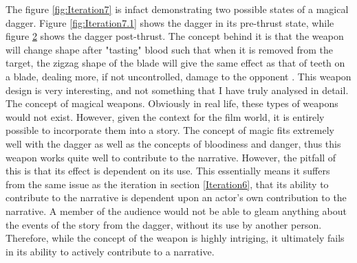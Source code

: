 \documentclass{article}
\begin{document}
\begin{figure}[h]
\begin{subfigure}{0.49\textwidth}
        \caption{}
        \label{fig:Iteration7.2}
    \end{subfigure}
\end{figure}

The figure \ref{fig:Iteration7} is infact demonstrating two possible states of a magical dagger. Figure \ref{fig:Iteration7.1} shows the dagger in its pre-thrust state, while figure \ref{fig:Iteration7.2} shows the dagger post-thrust. The concept behind it is that the weapon will change shape after "tasting" blood such that when it is removed from the target, the zigzag shape of the blade will give the same effect as that of teeth on a blade, dealing more, if not uncontrolled, damage to the opponent \parencite{kvietkova2015effect}. This weapon design is very interesting, and not something that I have truly analysed in detail. The concept of magical weapons. Obviously in real life, these types of weapons would not exist. However, given the context for the film world, it is entirely possible to incorporate them into a story. The concept of magic fits extremely well with the dagger as well as the concepts of bloodiness and danger, thus this weapon works quite well to contribute to the narrative. However, the pitfall of this is that its effect is dependent on its use. This essentially means it suffers from the same issue as the iteration in section \ref{Iteration6}, that its ability to contribute to the narrative is dependent upon an actor's own contribution to the narrative. A member of the audience would not be able to gleam anything about the events of the story from the dagger, without its use by another person. Therefore, while the concept of the weapon is highly intriging, it ultimately fails in its ability to actively contribute to a narrative.

\pagebreak

\printbibliography

\pagebreak
\end{document}
